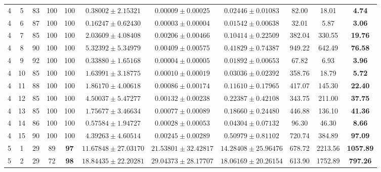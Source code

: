 \begin{table}[!ht]
{\begin{tabular}{|c|c|c|c|c|c|c|c|c|c|c|}
        4 & 5 & 83 & 100 & 100 & $0.38002 \pm 2.15321$ & $\mathbf{0.00009} \pm \mathbf{0.00025}$ & $0.02446 \pm 0.01083$ & 82.00 & 18.01 & \textbf{4.74} \\
        4 & 6 & 87 & 100 & 100 & $0.16247 \pm 0.62430$ & $\mathbf{0.00003} \pm \mathbf{0.00004}$ & $0.01542 \pm 0.00638$ & 32.01 & 5.87 & \textbf{3.06} \\
        4 & 7 & 85 & 100 & 100 & $2.03609 \pm 4.08408$ & $\mathbf{0.00206} \pm \mathbf{0.00466}$ & $0.10414 \pm 0.22509$ & 382.04 & 330.55 & \textbf{19.76} \\
        4 & 8 & 90 & 100 & 100 & $5.32392 \pm 5.34979$ & $\mathbf{0.00409} \pm \mathbf{0.00575}$ & $0.41829 \pm 0.74387$ & 949.22 & 642.49 & \textbf{76.58} \\
        4 & 9 & 92 & 100 & 100 & $0.33880 \pm 1.65168$ & $\mathbf{0.00004} \pm \mathbf{0.00005}$ & $0.01892 \pm 0.00653$ & 67.82 & 6.93 & \textbf{3.96} \\
        4 & 10 & 85 & 100 & 100 & $1.63991 \pm 3.18775$ & $\mathbf{0.00010} \pm \mathbf{0.00019}$ & $0.03036 \pm 0.02392$ & 358.76 & 18.79 & \textbf{5.72} \\
        4 & 11 & 88 & 100 & 100 & $1.86170 \pm 4.00618$ & $\mathbf{0.00086} \pm \mathbf{0.00174}$ & $0.11610 \pm 0.17965$ & 417.07 & 145.30 & \textbf{22.40} \\
        4 & 12 & 85 & 100 & 100 & $4.50037 \pm 5.47277$ & $\mathbf{0.00132} \pm \mathbf{0.00238}$ & $0.22387 \pm 0.42108$ & 343.75 & 211.00 & \textbf{37.75} \\
        4 & 13 & 85 & 100 & 100 & $1.75677 \pm 3.46634$ & $\mathbf{0.00077} \pm \mathbf{0.00089}$ & $0.18660 \pm 0.24480$ & 446.88 & 136.10 & \textbf{41.36} \\
        4 & 14 & 86 & 100 & 100 & $0.57584 \pm 1.94727$ & $\mathbf{0.00028} \pm \mathbf{0.00053}$ & $0.04304 \pm 0.07132$ & 96.30 & 46.30 & \textbf{8.66} \\
        4 & 15 & 90 & 100 & 100 & $4.39263 \pm 4.60514$ & $\mathbf{0.00245} \pm \mathbf{0.00289}$ & $0.50979 \pm 0.81102$ & 720.74 & 384.89 & \textbf{97.09} \\
        \hline
        5 & 1 & 29 & 89 & \textbf{97} & $11.67848 \pm 27.03170$ & $21.53801 \pm 32.42817$ & $\mathbf{14.28408} \pm \mathbf{25.96476}$ & 678.72 & 2213.56 & \textbf{1057.89} \\
        5 & 2 & 29 & 72 & \textbf{98} & $18.84435 \pm 22.20281$ & $29.04373 \pm 28.17707$ & $\mathbf{18.06169} \pm \mathbf{20.26154}$ & 613.90 & 1752.89 & \textbf{797.26} \\

\end{tabular}}
\end{table}
